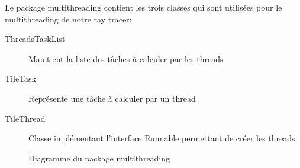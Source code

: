 \documentclass[../../Rapport RayTracer]{subfiles}
\begin{document}
	\label{packageMultithreading}
	
	Le package multithreading contient les trois classes qui sont utilisées pour le multithreading de notre ray tracer:
	\begin{description}
		\item [ThreadsTaskList] Maintient la liste des tâches à calculer par les threads
		\item [TileTask] Représente une tâche à calculer par un thread
		\item [TileThread] Classe implémentant l'interface Runnable permettant de créer les threads
	\end{description}
	
	\begin{figure}[h!]
		
		\caption{Diagramme du package multithreading}
		\label{packageMultithreadingFigure}
	\end{figure}
	\FloatBarrier
	
\end{document}
